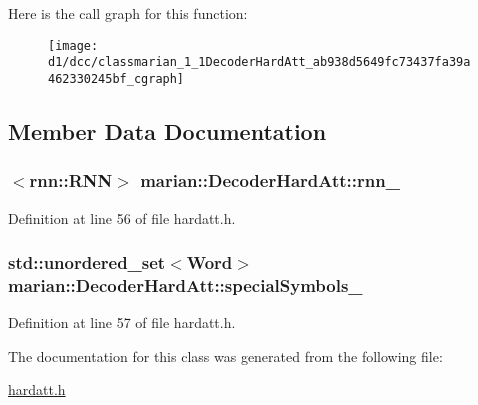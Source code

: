 Here is the call graph for this function\+:
\nopagebreak
\begin{figure}[H]
\begin{center}
\leavevmode
\texttt{[image: d1/dcc/classmarian\_1\_1DecoderHardAtt\_ab938d5649fc73437fa39a462330245bf\_cgraph]}
\end{center}
\end{figure}




\subsection{Member Data Documentation}
\subsubsection[{\texorpdfstring{rnn\+\_\+}{rnn_}}]{$<$rnn\+::\+R\+NN$>$ marian\+::\+Decoder\+Hard\+Att\+::rnn\+\_\+\hspace{0.3cm}{\ttfamily [protected]}}\hypertarget{classmarian_1_1DecoderHardAtt_a7e56a5d65ae8e1251b7c4fa572ac99a2}{}\label{classmarian_1_1DecoderHardAtt_a7e56a5d65ae8e1251b7c4fa572ac99a2}


Definition at line 56 of file hardatt.\+h.

\subsubsection[{\texorpdfstring{special\+Symbols\+\_\+}{specialSymbols_}}]{\setlength{\rightskip}{0pt plus 5cm}std\+::unordered\+\_\+set$<${\bf Word}$>$ marian\+::\+Decoder\+Hard\+Att\+::special\+Symbols\+\_\+\hspace{0.3cm}{\ttfamily [protected]}}\hypertarget{classmarian_1_1DecoderHardAtt_ae7483a3610b341043577f1d17d5b9241}{}\label{classmarian_1_1DecoderHardAtt_ae7483a3610b341043577f1d17d5b9241}


Definition at line 57 of file hardatt.\+h.



The documentation for this class was generated from the following file\+:\begin{DoxyCompactItemize}
\item 
\hyperlink{hardatt_8h}{hardatt.\+h}\end{DoxyCompactItemize}
